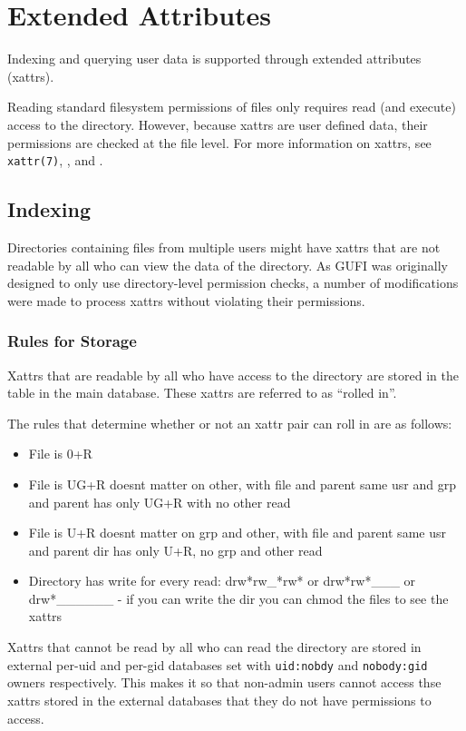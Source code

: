 \section{Extended Attributes}
Indexing and querying user data is supported through extended
attributes (xattrs).

Reading standard filesystem permissions of files only requires read
(and execute) access to the directory. However, because xattrs are
user defined data, their permissions are checked at the file
level. For more information on xattrs, see \texttt{xattr(7)},
\listxattr, and \getxattr.

\subsection{Indexing}
Directories containing files from multiple users might have xattrs
that are not readable by all who can view the \lstat data of the
directory. As GUFI was originally designed to only use directory-level
permission checks, a number of modifications were made to process
xattrs without violating their permissions.

\subsubsection{Rules for Storage}
Xattrs that are readable by all who have access to the directory are
stored in the \xattrspwd table in the main database. These xattrs are
referred to as ``rolled in''.

The rules that determine whether or not an xattr pair can roll in are
as follows:

\begin{itemize}
\item File is 0+R
\item File is UG+R doesnt matter on other, with file and parent same
  usr and grp and parent has only UG+R with no other read
\item File is U+R doesnt matter on grp and other, with file and parent
  same usr and parent dir has only U+R, no grp and other read
\item Directory has write for every read: drw*rw\_*rw* or
  drw*rw*\_\_\_ or drw*\_\_\_\_\_\_ - if you can write the dir you can
  chmod the files to see the xattrs
\end{itemize}

Xattrs that cannot be read by all who can read the directory are
stored in external per-uid and per-gid databases set with
\texttt{uid:nobdy} and \texttt{nobody:gid} owners respectively. This
makes it so that non-admin users cannot access thse xattrs stored in
the external databases that they do not have permissions to access.


